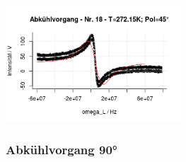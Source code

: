 \documentclass[12pt]{article}
\begin{document}
\begin{minipage}[h!]{\textwidth}
{		\includegraphics[width=0.49\textwidth]{figures/cold45-18.png}\vskip -10pt}
\end{minipage}\newpage


\subsubsection{Abkühlvorgang 90°}
\end{document}
